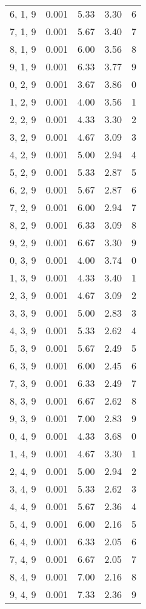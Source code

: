\documentclass[12pt]{article}
\begin{document}
\begin{tabular}{c || c || c | c | c}
6, 1, 9 & 0.001 & 5.33 & 3.30 & 6 \\
7, 1, 9 & 0.001 & 5.67 & 3.40 & 7 \\
8, 1, 9 & 0.001 & 6.00 & 3.56 & 8 \\
9, 1, 9 & 0.001 & 6.33 & 3.77 & 9 \\
0, 2, 9 & 0.001 & 3.67 & 3.86 & 0 \\
1, 2, 9 & 0.001 & 4.00 & 3.56 & 1 \\
2, 2, 9 & 0.001 & 4.33 & 3.30 & 2 \\
3, 2, 9 & 0.001 & 4.67 & 3.09 & 3 \\
4, 2, 9 & 0.001 & 5.00 & 2.94 & 4 \\
5, 2, 9 & 0.001 & 5.33 & 2.87 & 5 \\
6, 2, 9 & 0.001 & 5.67 & 2.87 & 6 \\
7, 2, 9 & 0.001 & 6.00 & 2.94 & 7 \\
8, 2, 9 & 0.001 & 6.33 & 3.09 & 8 \\
9, 2, 9 & 0.001 & 6.67 & 3.30 & 9 \\
0, 3, 9 & 0.001 & 4.00 & 3.74 & 0 \\
1, 3, 9 & 0.001 & 4.33 & 3.40 & 1 \\
2, 3, 9 & 0.001 & 4.67 & 3.09 & 2 \\
3, 3, 9 & 0.001 & 5.00 & 2.83 & 3 \\
4, 3, 9 & 0.001 & 5.33 & 2.62 & 4 \\
5, 3, 9 & 0.001 & 5.67 & 2.49 & 5 \\
6, 3, 9 & 0.001 & 6.00 & 2.45 & 6 \\
7, 3, 9 & 0.001 & 6.33 & 2.49 & 7 \\
8, 3, 9 & 0.001 & 6.67 & 2.62 & 8 \\
9, 3, 9 & 0.001 & 7.00 & 2.83 & 9 \\
0, 4, 9 & 0.001 & 4.33 & 3.68 & 0 \\
1, 4, 9 & 0.001 & 4.67 & 3.30 & 1 \\
2, 4, 9 & 0.001 & 5.00 & 2.94 & 2 \\
3, 4, 9 & 0.001 & 5.33 & 2.62 & 3 \\
4, 4, 9 & 0.001 & 5.67 & 2.36 & 4 \\
5, 4, 9 & 0.001 & 6.00 & 2.16 & 5 \\
6, 4, 9 & 0.001 & 6.33 & 2.05 & 6 \\
7, 4, 9 & 0.001 & 6.67 & 2.05 & 7 \\
8, 4, 9 & 0.001 & 7.00 & 2.16 & 8 \\
9, 4, 9 & 0.001 & 7.33 & 2.36 & 9 \\

\end{tabular}
\end{document}
